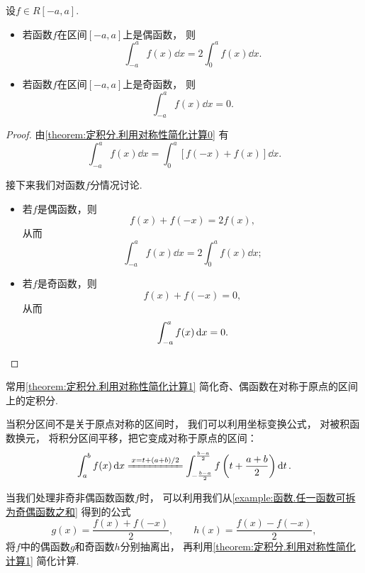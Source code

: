 \begin{proposition}\label{theorem:定积分.利用对称性简化计算1}
设\(f \in R[-a,a]\).
\begin{itemize}
	\item 若函数\(f\)在区间\([-a,a]\)上是偶函数，
	则\[
		\int_{-a}^a f(x) \dd{x} = 2 \int_0^a f(x) \dd{x}.
	\]

	\item 若函数\(f\)在区间\([-a,a]\)上是奇函数，
	则\[
		\int_{-a}^a f(x) \dd{x} = 0.
	\]
\end{itemize}
\begin{proof}
由\cref{theorem:定积分.利用对称性简化计算0} 有\[
	\int_{-a}^a f(x) \dd{x}
	= \int_0^a [f(-x) + f(x)] \dd{x}.
\]

接下来我们对函数\(f\)分情况讨论.
\begin{itemize}
	\item 若\(f\)是偶函数，则\[
		f(x) + f(-x) = 2 f(x),
	\]
	从而\[
		\int_{-a}^a f(x) \dd{x} = 2 \int_0^a f(x) \dd{x};
	\]

	\item 若\(f\)是奇函数，则\[
		f(x) + f(-x) = 0,
	\]
	从而\[
		\int_{-a}^a f(x) \dd{x} = 0.
		\qedhere
	\]
\end{itemize}
\end{proof}
\end{proposition}
\begin{remark}
常用\cref{theorem:定积分.利用对称性简化计算1} 简化奇、偶函数在对称于原点的区间上的定积分.

当积分区间不是关于原点对称的区间时，
我们可以利用坐标变换公式，
对被积函数换元，
将积分区间平移，把它变成对称于原点的区间：\begin{equation}\label{equation:定积分.区间平移}
	\int_a^b f(x) \dd{x}
	\xlongequal{x=t+(a+b)/2}
	\int_{-\frac{b-a}2}^{\frac{b-a}2} f\left(t+\frac{a+b}2\right) \dd{t}.
\end{equation}

当我们处理非奇非偶函数函数\(f\)时，
可以利用我们从\cref{example:函数.任一函数可拆为奇偶函数之和} 得到的公式\[
	g(x) = \frac{f(x) + f(-x)}{2}, \qquad
	h(x) = \frac{f(x) - f(-x)}{2},
\]
将\(f\)中的偶函数\(g\)和奇函数\(h\)分别抽离出，
再利用\cref{theorem:定积分.利用对称性简化计算1} 简化计算.
\end{remark}

